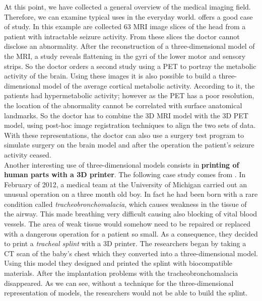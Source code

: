 At this point, we have collected a general overview of the medical imaging field. Therefore, we can examine typical uses in the everyday world. \cite{Stytz} offers a good case of study. In this example are collected 63 MRI image slices of the head from a patient with intractable seizure activity. From these slices the doctor cannot disclose an abnormality. After the reconstruction of a three-dimensional model of the MRI, a study reveals flattening in the gyri of the lower motor and sensory strips. So the doctor orders a second study using a PET to portray the metabolic activity of the brain. Using these images it is also possible to build a three-dimensional model of the average cortical metabolic activity. According to it, the patients had hypermetabolic activity; however as the PET has a poor resolution, the location of the abnormality cannot be correlated with surface anatomical landmarks. So the doctor has to combine the 3D MRI model with the 3D PET model, using post-hoc image registration techniques to align the two sets of data. With these representations, the doctor can also use a surgery test program to simulate surgery on the brain model and after the operation the patient's seizure activity ceased.\\

Another interesting use of three-dimensional models consists in \textbf{printing of human parts with a 3D printer}.
The following case study comes from \cite{Zopf}. In February of 2012, a medical team at the University of Michigan carried out an unusual operation on a three month old boy. In fact he had been born with a rare condition called \textit{tracheobronchomalacia}, which causes weakness in the tissue of the airway. This made breathing very difficult causing also blocking of vital blood vessels. The area of weak tissue would somehow need to be repaired or replaced with a dangerous operation for a patient so small. As a consequence, they decided to print a \textit{tracheal splint} with a 3D printer. The researchers began by taking a CT scan of the baby's chest which they converted into a three-dimensional model. Using this model they designed and printed the splint with biocompatible materials. After the implantation problems with the tracheobronchomalacia disappeared.
As we can see, without a technique for the three-dimensional representation of models, the researchers would not be able to build the splint.

